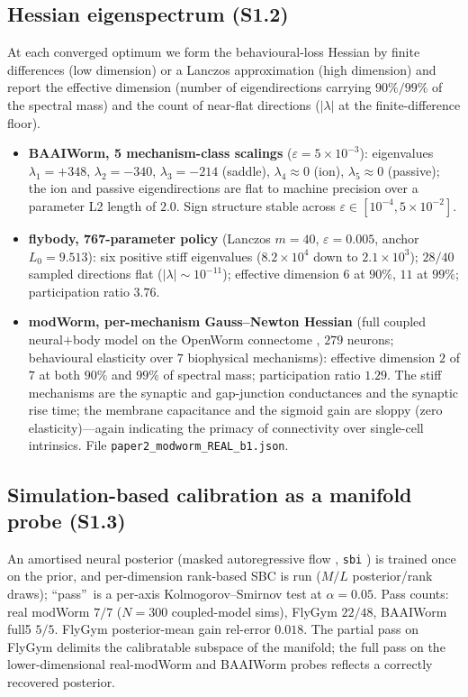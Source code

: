 \documentclass[11pt]{article}
\begin{document}
\subsection{Hessian eigenspectrum (S1.2)}
At each converged optimum we form the behavioural-loss Hessian by finite differences (low dimension) or a Lanczos approximation (high dimension) and report the effective dimension (number of eigendirections carrying $90\%/99\%$ of the spectral mass) and the count of near-flat directions ($|\lambda|$ at the finite-difference floor).
\begin{itemize}\itemsep1pt
\item \textbf{BAAIWorm, 5 mechanism-class scalings} ($\varepsilon{=}5\times10^{-3}$): eigenvalues $\lambda_1{=}+348$, $\lambda_2{=}-340$, $\lambda_3{=}-214$ (saddle), $\lambda_4{\approx}0$ (ion), $\lambda_5{\approx}0$ (passive); the ion and passive eigendirections are flat to machine precision over a parameter L2 length of $2.0$. Sign structure stable across $\varepsilon\in[10^{-4},5\times10^{-2}]$.
\item \textbf{flybody, 767-parameter policy} (Lanczos $m{=}40$, $\varepsilon{=}0.005$, anchor $L_0{=}9.513$): six positive stiff eigenvalues ($8.2\times10^4$ down to $2.1\times10^3$); $28/40$ sampled directions flat ($|\lambda|\sim10^{-11}$); effective dimension $6$ at $90\%$, $11$ at $99\%$; participation ratio $3.76$.
\item \textbf{modWorm, per-mechanism Gauss--Newton Hessian} (full coupled neural$+$body model on the OpenWorm connectome \citep{szigeti2014openworm,gleeson2018c302}, $279$ neurons; behavioural elasticity over $7$ biophysical mechanisms): effective dimension $2$ of $7$ at both $90\%$ and $99\%$ of spectral mass; participation ratio $1.29$. The stiff mechanisms are the synaptic and gap-junction conductances and the synaptic rise time; the membrane capacitance and the sigmoid gain are sloppy (zero elasticity)---again indicating the primacy of connectivity over single-cell intrinsics. File \texttt{paper2\_modworm\_REAL\_b1.json}.
\end{itemize}

\subsection{Simulation-based calibration as a manifold probe (S1.3)}
An amortised neural posterior (masked autoregressive flow \citep{papamakarios2017maf}, \texttt{sbi} \citep{tejero2020sbi}) is trained once on the prior, and per-dimension rank-based SBC \citep{talts2018validating,hermans2022sbc} is run ($M/L$ posterior/rank draws); ``pass''\ is a per-axis Kolmogorov--Smirnov test at $\alpha{=}0.05$. Pass counts: real modWorm $7/7$ ($N{=}300$ coupled-model sims), FlyGym $22/48$, BAAIWorm full5 $5/5$. FlyGym posterior-mean gain rel-error $0.018$. The partial pass on FlyGym delimits the calibratable subspace of the manifold; the full pass on the lower-dimensional real-modWorm and BAAIWorm probes reflects a correctly recovered posterior.
\end{document}
